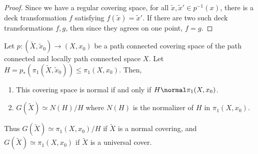 \begin{proof}
Since we have a regular covering space, for all $\tilde{x},\tilde{x}'\in p^{-1}(x)$, there is a deck transformation $f$ satisfying $f(\tilde{x})=\tilde{x}'$. If there are two such deck transformations $f,g$, then since they agrees on one point, $f=g$.
\end{proof}
\begin{prop} Let $p:(\tilde{X},\tilde{x}_0)\rightarrow (X,x_0)$ be a path connected covering space of the path connected and locally path connected space $X$. Let $H= p_*(\pi_1(\tilde{X},\tilde{x}_0))\leq \pi_1(X,x_0)$. Then,
\begin{enumerate}
\item This covering space is normal if and only if $H\normal \pi_1(X,x_0)$.
\item $G(\tilde{X})\simeq N(H)/H$ where $N(H)$ is the normalizer of $H$ in $\pi_1(X,x_0)$.
\end{enumerate}
Thus $G(\tilde{X})\simeq \pi_1(X,x_0)/H$ if $\tilde{X}$ is a normal covering, and $G(\tilde{X})\simeq \pi_1(X,x_0)$ if $\tilde{X}$ is a universal cover.
\end{prop}
